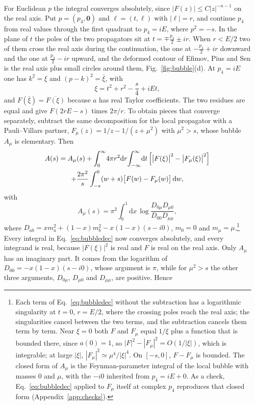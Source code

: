 \documentclass[a4paper,11pt]{article}
\newcommand{\dd}{\mathrm{d}}
\begin{document}
For Euclidean $p$ the integral converges absolutely, since $|F(z)|\le C|z|^{-n-1}$ on the real axis. Put $p=(p_4,\mathbf 0)$ and $\ell=(t,\boldsymbol\ell)$ with $|\boldsymbol\ell|=r$, and continue $p_4$ from real values through the first quadrant to $p_4=iE$, where $p^2=-s$. In the plane of $t$ the poles of the two propagators sit at $t=\mp\frac{p_4}2\pm ir$. When $r<E/2$ two of them cross the real axis during the continuation, the one at $-\frac{p_4}2+ir$ downward and the one at $\frac{p_4}2-ir$ upward, and the deformed contour of Efimov, Pius and Sen is the real axis plus small circles around them, Fig.~\ref{fig:bubble}(d). At $p_4=iE$ one has $k^2=\xi$ and $(p-k)^2=\bar\xi$, with
\[
\xi=t^2+r^2-\frac s4+iEt ,
\]
and $F(\bar\xi)=\overline{F(\xi)}$ because $a$ has real Taylor coefficients. The two residues are equal and give $F(2rE-s)$ times $2\pi/r$. To obtain pieces that converge separately, subtract the same decomposition for the local propagator with a Pauli--Villars partner, $F_\mu(z)=1/z-1/(z+\mu^2)$ with $\mu^2>s$, whose bubble $A_\mu$ is elementary. Then
\begin{multline}
\label{eq:bubbledec}
A(s)=A_\mu(s)+\int_0^\infty\!4\pi r^2\dd r\!\int_{-\infty}^{\infty}\!\dd t\,\Bigl[\bigl|F(\xi)\bigr|^2-\bigl|F_\mu(\xi)\bigr|^2\Bigr]\\
+\frac{2\pi^2}{s}\int_{-s}^0(w+s)\bigl[F(w)-F_\mu(w)\bigr]\,\dd w ,
\end{multline}
with
\[
A_\mu(s)=\pi^2\!\int_0^1\!\dd x\,\log\frac{D_{0\mu}D_{\mu0}}{D_{00}D_{\mu\mu}},
\]
where $D_{ab}=xm_a^2+(1-x)m_b^2-x(1-x)(s-i0)$, $m_0=0$ and $m_\mu=\mu$.\footnote{Each term of Eq.~\eqref{eq:bubbledec} without the subtraction has a logarithmic singularity at $t=0$, $r=E/2$, where the crossing poles reach the real axis; the singularities cancel between the two terms, and the subtraction cancels them term by term. Near $\xi=0$ both $F$ and $F_\mu$ equal $1/\xi$ plus a function that is bounded there, since $a(0)=1$, so $|F|^2-|F_\mu|^2=O(1/|\xi|)$, which is integrable; at large $|\xi|$, $|F_\mu|^2\simeq\mu^4/|\xi|^4$. On $[-s,0]$, $F-F_\mu$ is bounded. The closed form of $A_\mu$ is the Feynman-parameter integral of the local bubble with masses $0$ and $\mu$, with the $-i0$ inherited from $p_4=iE+0$. As a check, Eq.~\eqref{eq:bubbledec} applied to $F_\mu$ itself at complex $p_4$ reproduces that closed form (Appendix~\ref{app:checks}).} Every integral in Eq.~\eqref{eq:bubbledec} now converges absolutely, and every integrand is real, because $|F(\xi)|^2$ is real and $F$ is real on the real axis. Only $A_\mu$ has an imaginary part. It comes from the logarithm of $D_{00}=-x(1-x)(s-i0)$, whose argument is $\pi$, while for $\mu^2>s$ the other three arguments, $D_{0\mu}$, $D_{\mu0}$ and $D_{\mu\mu}$, are positive. Hence
\end{document}
